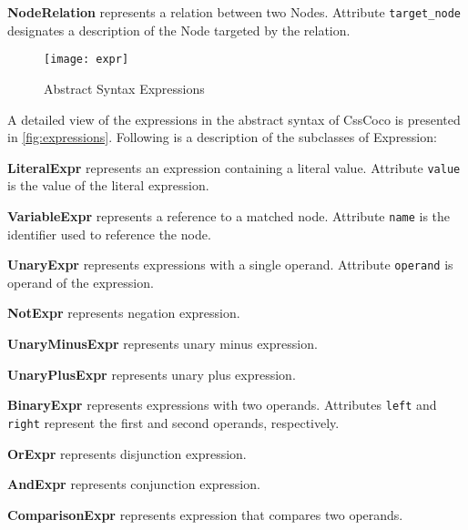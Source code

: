 \begin{description}
\item\textbf{NodeRelation} represents a relation between two Nodes. Attribute \texttt{target\_node}
designates a description of the Node targeted by the relation.

\end{description}


\begin{figure}[h]
  \centering
  \caption{Abstract Syntax Expressions}
  \label{fig:expressions}
  \texttt{[image: expr]}
\end{figure}

A detailed view of the expressions in the abstract syntax of CssCoco is presented in \autoref{fig:expressions}. Following is a description of the subclasses of Expression:

\begin{description}

\item\textbf{LiteralExpr} represents an expression containing a literal value. Attribute \texttt{value} is the value of the literal expression.

\item\textbf{VariableExpr} represents a reference to a matched node. Attribute \texttt{name} is the identifier used to reference the node.

\item\textbf{UnaryExpr} represents expressions with a single operand. Attribute \texttt{operand} is operand of the expression.

\item\textbf{NotExpr} represents negation expression.

\item\textbf{UnaryMinusExpr} represents unary minus expression.

\item\textbf{UnaryPlusExpr} represents unary plus expression.

\item\textbf{BinaryExpr} represents expressions with two operands. Attributes \texttt{left} and \texttt{right} represent the first and second operands, respectively.

\item\textbf{OrExpr} represents disjunction expression.

\item\textbf{AndExpr} represents conjunction expression.

\item\textbf{ComparisonExpr} represents expression that compares two operands.


\end{description}

